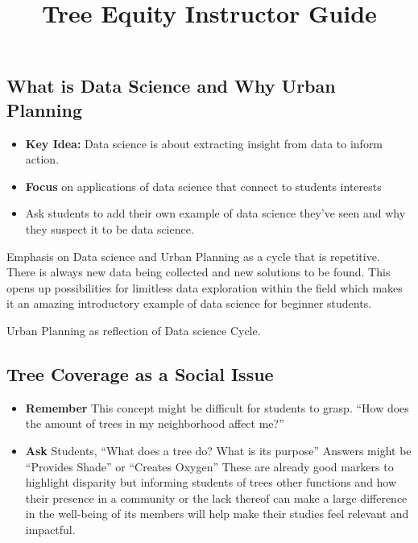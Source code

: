 \documentclass[
  letterpaper,
  DIV=11,
  numbers=noendperiod,
  oneside]{scrartcl}
\title{Tree Equity Instructor Guide}
\author{}
\date{}
\providecommand{\tightlist}{%
  \setlength{\itemsep}{0pt}\setlength{\parskip}{0pt}}\usepackage{longtable,booktabs,array}
\begin{document}
\maketitle
\ifdefined\Shaded\renewenvironment{Shaded}{\begin{tcolorbox}[frame hidden, boxrule=0pt, sharp corners, interior hidden, borderline west={3pt}{0pt}{shadecolor}, enhanced, breakable]}{\end{tcolorbox}}\fi

\hypertarget{what-is-data-science-and-why-urban-planning}{%
\subsection{What is Data Science and Why Urban
Planning}\label{what-is-data-science-and-why-urban-planning}}

\begin{itemize}
\tightlist
\item
  \textbf{Key Idea:} Data science is about extracting insight from data
  to inform action.
\item
  \textbf{Focus} on applications of data science that connect to
  students interests
\item
  Ask students to add their own example of data science they've seen and
  why they suspect it to be data science.
\end{itemize}

Emphasis on Data science and Urban Planning as a cycle that is
repetitive. There is always new data being collected and new solutions
to be found. This opens up possibilities for limitless data exploration
within the field which makes it an amazing introductory example of data
science for beginner students.

Urban Planning as reflection of Data science Cycle.

\hypertarget{tree-coverage-as-a-social-issue}{%
\subsection{Tree Coverage as a Social
Issue}\label{tree-coverage-as-a-social-issue}}

\begin{itemize}
\tightlist
\item
  \textbf{Remember} This concept might be difficult for students to
  grasp. ``How does the amount of trees in my neighborhood affect me?''
\item
  \textbf{Ask} Students, ``What does a tree do? What is its purpose''
  Answers might be ``Provides Shade'' or ``Creates Oxygen'' These are
  already good markers to highlight disparity but informing students of
  trees other functions and how their presence in a community or the
  lack thereof can make a large difference in the well-being of its
  members will help make their studies feel relevant and impactful.
\end{itemize}
\end{document}
